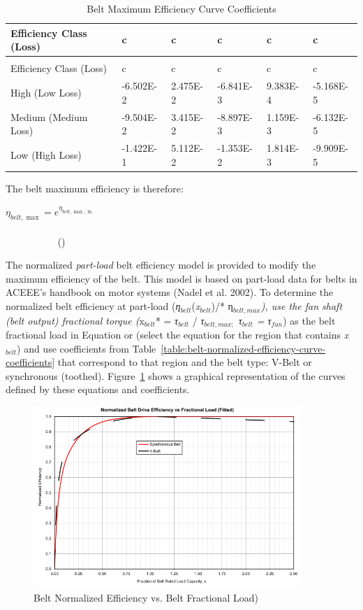\begin{longtable}[c]{p{1.0in}p{1.0in}p{1.0in}p{1.0in}p{1.0in}p{1.0in}}
\caption{Belt Maximum Efficiency Curve Coefficients \label{table:belt-maximum-efficiency-curve-coefficients}} \tabularnewline
\toprule 
Efficiency Class (Loss) & c & c & c & c & c \tabularnewline
\midrule
\endfirsthead

\caption[]{Belt Maximum Efficiency Curve Coefficients} \tabularnewline
\toprule 
Efficiency Class (Loss) & c & c & c & c & c \tabularnewline
\midrule
\endhead

High (Low Loss) & -6.502E-2 & 2.475E-2 & -6.841E-3 & 9.383E-4 & -5.168E-5 \tabularnewline
Medium (Medium Loss) & -9.504E-2 & 3.415E-2 & -8.897E-3 & 1.159E-3 & -6.132E-5 \tabularnewline
Low (High Loss) & -1.422E-1 & 5.112E-2 & -1.353E-2 & 1.814E-3 & -9.909E-5 \tabularnewline
\bottomrule
\end{longtable}

The belt maximum efficiency is therefore:

\({\eta_{belt,\max }} = {e^{{\eta_{belt,\max ,\ln }}}}\) ~~~~~~~~~~~~~~~~~~~~~~~~~~~~~~~~~~~~~~~~~~~~~~~~~~~~~~~~~~~~~~~~~~~~~~~~~~~~~~~~~~ ()

The normalized \emph{part-load} belt efficiency model is provided to modify the maximum efficiency of the belt. This model is based on part-load data for belts in ACEEE's handbook on motor systems (Nadel et al. 2002). To determine the normalized belt efficiency at part-load (\emph{η\(_{belt}\)}(\emph{x\(_{belt}\)})/* η\(_{belt,max}\)\emph{), use the fan shaft (belt output) fractional torque (}x\(_{belt}\)* = \emph{τ\(_{belt}\)} / \emph{τ\(_{belt,max;}\) τ\(_{belt}\) = τ\(_{fan}\)}) as the belt fractional load in Equation or (select the equation for the region that contains \emph{x\(_{belt}\)}) and use coefficients from Table~\ref{table:belt-normalized-efficiency-curve-coefficients} that correspond to that region and the belt type: V-Belt or synchronous (toothed). Figure~\ref{fig:belt-normalized-efficiency-vs.-belt} shows a graphical representation of the curves defined by these equations and coefficients.

\begin{figure}[hbtp] %
\centering
\includegraphics[width=0.9\textwidth, height=0.9\textheight, keepaspectratio=true]{media/image4910.svg.png}
\caption{Belt Normalized Efficiency vs. Belt Fractional Load) \protect \label{fig:belt-normalized-efficiency-vs.-belt}}
\end{figure}

